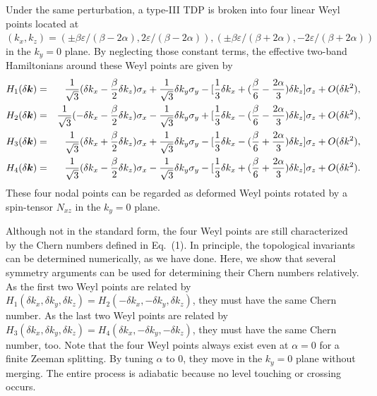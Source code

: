 \documentclass[aps,prl,floatfix,twocolumn,reprint]{revtex4}
\begin{document}
Under the same perturbation, a type-III TDP is broken into four linear Weyl
points located at $(k_{x},k_{z})=(\pm \beta \varepsilon /(\beta -2\alpha
),2\varepsilon /(\beta -2\alpha )),(\pm \beta \varepsilon /(\beta +2\alpha
),-2\varepsilon /(\beta+2\alpha ))$ in the $k_{y}=0$ plane. By neglecting
those constant terms, the effective two-band Hamiltonians around these Weyl
points are given by
\begin{eqnarray}
H_{1}(\delta \bm{k}) &=&\frac{1}{\sqrt{3}}(\delta k_{x}-\frac{\beta }{2}%
\delta k_{z})\sigma _{x}+\frac{1}{\sqrt{3}}\delta k_{y}\sigma _{y}-[\frac{1}{%
3}\delta k_{x}+(\frac{\beta }{6}-\frac{2\alpha }{3})\delta k_{z}]\sigma
_{z}+O(\delta k^{2}), \\
H_{2}(\delta \bm{k}) &=&\frac{1}{\sqrt{3}}(-\delta k_{x}-\frac{\beta }{2}%
\delta k_{z})\sigma _{x}-\frac{1}{\sqrt{3}}\delta k_{y}\sigma _{y}+[\frac{1}{%
3}\delta k_{x}-(\frac{\beta }{6}-\frac{2\alpha }{3})\delta k_{z}]\sigma
_{z}+O(\delta k^{2}), \\
H_{3}(\delta \bm{k}) &=&\frac{1}{\sqrt{3}}(\delta k_{x}+\frac{\beta }{2}%
\delta k_{z})\sigma _{x}+\frac{1}{\sqrt{3}}\delta k_{y}\sigma _{y}-[\frac{1}{%
3}\delta k_{x}-(\frac{\beta }{6}+\frac{2\alpha }{3})\delta k_{z}]\sigma
_{z}+O(\delta k^{2}), \\
H_{4}(\delta \bm{k}) &=&\frac{1}{\sqrt{3}}(\delta k_{x}-\frac{\beta }{2}%
\delta k_{z})\sigma _{x}-\frac{1}{\sqrt{3}}\delta k_{y}\sigma _{y}-[\frac{1}{%
3}\delta k_{x}+(\frac{\beta }{6}+\frac{2\alpha }{3})\delta k_{z}]\sigma
_{z}+O(\delta k^{2}).
\end{eqnarray}%
These four nodal points can be regarded as deformed Weyl points rotated by a
spin-tensor $N_{xz}$ in the $k_y=0$ plane.

Although not in the standard form, the four Weyl points are still
characterized by the Chern numbers defined in Eq.~(1). In principle, the
topological invariants can be determined numerically, as we have done. Here,
we show that several symmetry arguments can be used for determining their
Chern numbers relatively. As the first two Weyl points are related by $%
H_{1}(\delta k_{x},\delta k_{y},\delta k_{z})=H_{2}(-\delta k_{x},-\delta
k_{y},\delta k_{z})$, they must have the same Chern number. As the last two
Weyl points are related by $H_{3}(\delta k_{x},\delta k_{y},\delta
k_{z})=H_{4}(\delta k_{x},-\delta k_{y},-\delta k_{z})$, they must have the
same Chern number, too. Note that the four Weyl points always exist even at $%
\alpha =0$ for a finite Zeeman splitting. By tuning $\alpha $ to $0$, they
move in the $k_{y}=0$ plane without merging. The entire process is adiabatic
because no level touching or crossing occurs.
\end{document}

